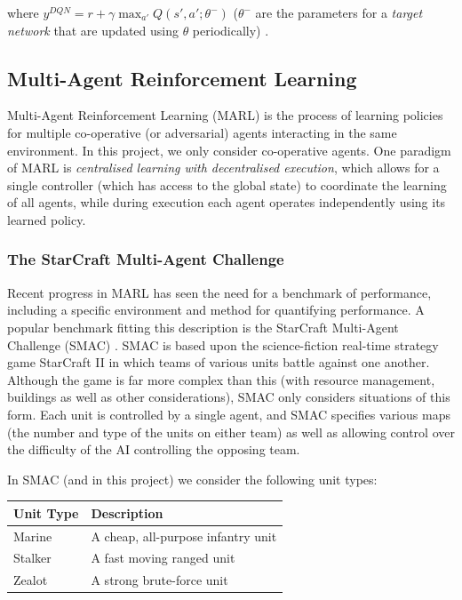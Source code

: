 where $y^{DQN}=r+\gamma \max_{a'}Q(s',a';\theta^-)$ ($\theta^-$ are the parameters for a \textit{target network} that are updated using $\theta$ periodically) \cite{qmixcite}.



\subsection{Multi-Agent Reinforcement Learning}
Multi-Agent Reinforcement Learning (MARL) is the process of learning policies for multiple co-operative (or adversarial) agents interacting in the same environment. In this project, we only consider co-operative agents. One paradigm of MARL is \textit{centralised learning with decentralised execution}, which allows for a single controller (which has access to the global state) to coordinate the learning of all agents, while during execution each agent operates independently using its learned policy.

\subsubsection{The StarCraft Multi-Agent Challenge}

Recent progress in MARL has seen the need for a benchmark of performance, including a specific environment and method for quantifying performance. A popular benchmark fitting this description is the StarCraft Multi-Agent Challenge (SMAC) \cite{smac}. SMAC is based upon the science-fiction real-time strategy game StarCraft II in which teams of various units battle against one another. Although the game is far more complex than this (with resource management, buildings as well as other considerations), SMAC only considers situations of this form. Each unit is controlled by a single agent, and SMAC specifies various maps (the number and type of the units on either team) as well as allowing control over the difficulty of the AI controlling the opposing team. 


In SMAC (and in this project) we consider the following unit types:

\vspace{3mm}
\begin{center}
\begin{tabular}{ |p{2.5cm}||p{6.6cm}|  }
 \hline
 \centering Unit Type& \centering Description \tabularnewline
 \hline
 \centering Marine   & A cheap, all-purpose infantry unit\tabularnewline
 \hline
 \centering Stalker   & A fast moving ranged unit\tabularnewline
 \hline
 \centering Zealot   &  A strong brute-force unit\tabularnewline
 \hline
 
\end{tabular}
\end{center}
\vspace{3mm}


